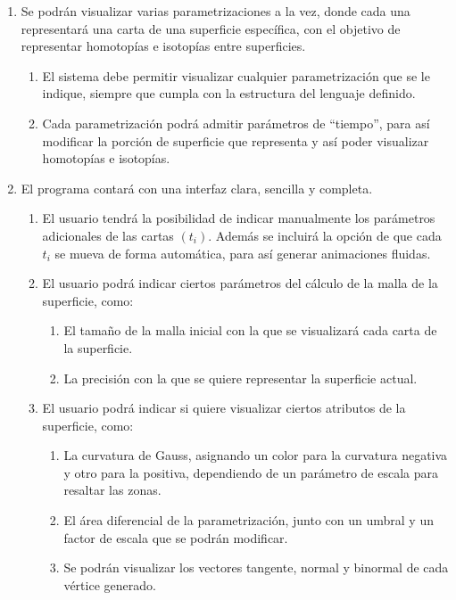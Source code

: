 	\begin{enumerate}
		\item Se podrán visualizar varias parametrizaciones a la vez, donde cada una representará una carta de una superficie específica, con el objetivo de representar homotopías e isotopías entre superficies.
		\begin{enumerate}
			\item El sistema debe permitir visualizar cualquier parametrización que se le indique, siempre que cumpla con la estructura del lenguaje definido.
			\item Cada parametrización podrá admitir parámetros de ``tiempo'', para así modificar la porción de superficie que representa y así poder visualizar homotopías e isotopías.
		\end{enumerate}
		
		\item El programa contará con una interfaz clara, sencilla y completa.
		\begin{enumerate}
			\item El usuario tendrá la posibilidad de indicar manualmente los parámetros adicionales de las cartas $(t_i)$. Además se incluirá la opción de que cada $t_i$ se mueva de forma automática, para así generar animaciones fluidas.
			
			\item El usuario podrá indicar ciertos parámetros del cálculo de la malla de la superficie, como:
			\begin{enumerate}
				\item El tamaño de la malla inicial con la que se visualizará cada carta de la superficie.
				\item La precisión con la que se quiere representar la superficie actual.
			\end{enumerate}
				
			\item El usuario podrá indicar si quiere visualizar ciertos atributos de la superficie, como:
			\begin{enumerate}
				\item La curvatura de Gauss, asignando un color para la curvatura negativa y otro para la positiva, dependiendo de un parámetro de escala para resaltar las zonas.
				\item El área diferencial de la parametrización, junto con un umbral y un factor de escala que se podrán modificar.
				\item Se podrán visualizar los vectores tangente, normal y binormal de cada vértice generado.
			\end{enumerate}
			

\end{enumerate}
\end{enumerate}
